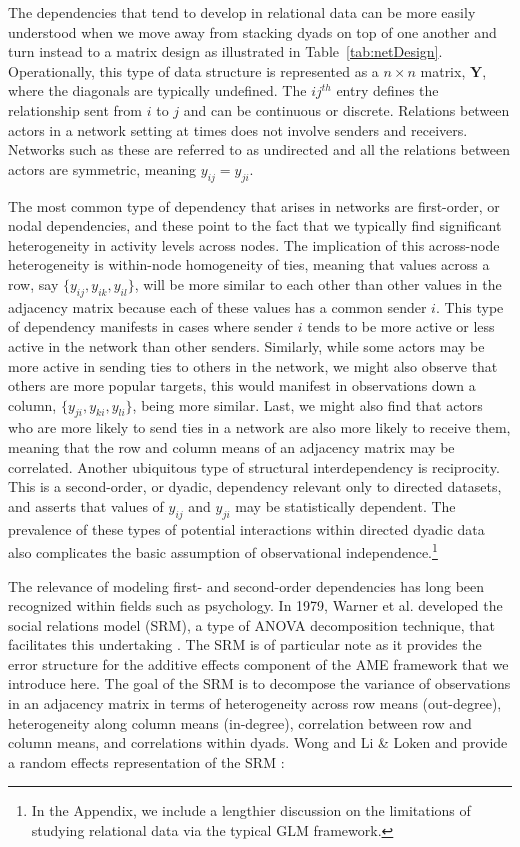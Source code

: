 \documentclass[12pt,pdflatex]{elsarticle}
\begin{document}
The dependencies that tend to develop in relational data can be more easily understood when we move away from stacking dyads on top of one another and turn instead to a matrix design as illustrated in Table~\ref{tab:netDesign}. Operationally, this type of data structure is represented as a $n \times n$ matrix, $\mathbf{Y}$, where the diagonals are typically undefined. The $ij^{th}$ entry defines the relationship sent from $i$ to $j$ and can be continuous or discrete. Relations between actors in a network setting at times does not involve senders and receivers. Networks such as these are referred to as undirected and all the relations between actors are symmetric, meaning $y_{ij}=y_{ji}$.

The most common type of dependency that arises in networks are first-order, or nodal dependencies, and these point to the fact that we typically find significant heterogeneity in activity levels across nodes. The implication of this across-node heterogeneity is within-node homogeneity of ties, meaning that values across a row, say $\{y_{ij},y_{ik},y_{il}\}$, will be more similar to each other than other values in the adjacency matrix because each of these values has a common sender $i$. This type of dependency manifests in cases where sender $i$ tends to be more active or less active in the network than other senders. Similarly, while some actors may be more active in sending ties to others in the network, we might also observe that others are more popular targets, this would manifest in observations down a column, $\{y_{ji},y_{ki},y_{li}\}$, being more similar. Last, we might also find that actors who are more likely to send ties in a network are also more likely to receive them, meaning that the row and column means of an adjacency matrix may be correlated. Another ubiquitous type of structural interdependency is reciprocity. This is a second-order, or dyadic, dependency relevant only to directed datasets, and asserts that values of $y_{ij}$ and $y_{ji}$ may be statistically dependent. The prevalence of these types of potential interactions within directed dyadic data also complicates the basic assumption of observational independence.\footnote{In the Appendix, we include a lengthier discussion on the limitations of studying relational data via the typical GLM framework.}

The relevance of modeling first- and second-order dependencies has long been recognized within fields such as psychology. In 1979, Warner et al. developed the social relations model (SRM), a type of ANOVA decomposition technique, that facilitates this undertaking \cite{warner:etal:1979}. The SRM is of particular note as it provides the error structure for the additive effects component of the AME framework that we introduce here. The goal of the SRM is to decompose the variance of observations in an adjacency matrix in terms of heterogeneity across row means (out-degree), heterogeneity along column means (in-degree), correlation between row and column means, and correlations within dyads. Wong and Li \& Loken and provide a random effects representation of the SRM \cite{wong:1982,li:loken:2002}:
\end{document}
